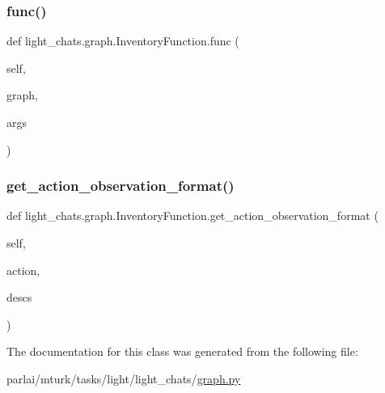 \subsubsection{\texorpdfstring{func()}{func()}}
{\footnotesize\ttfamily def light\+\_\+chats.\+graph.\+Inventory\+Function.\+func (\begin{DoxyParamCaption}\item[{}]{self,  }\item[{}]{graph,  }\item[{}]{args }\end{DoxyParamCaption})}

\mbox{\label{classlight__chats_1_1graph_1_1InventoryFunction_a9527cd8b211efa8aafc21b2a40b14760}} 
\subsubsection{\texorpdfstring{get\+\_\+action\+\_\+observation\+\_\+format()}{get\_action\_observation\_format()}}
{\footnotesize\ttfamily def light\+\_\+chats.\+graph.\+Inventory\+Function.\+get\+\_\+action\+\_\+observation\+\_\+format (\begin{DoxyParamCaption}\item[{}]{self,  }\item[{}]{action,  }\item[{}]{descs }\end{DoxyParamCaption})}



The documentation for this class was generated from the following file\+:\begin{DoxyCompactItemize}
\item 
parlai/mturk/tasks/light/light\+\_\+chats/\hyperlink{parlai_2mturk_2tasks_2light_2light__chats_2graph_8py}{graph.\+py}\end{DoxyCompactItemize}
